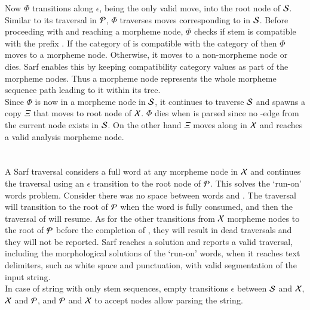 Now $\Phi$ transitions along $\epsilon$, being the only valid move, into the root node of ${\cal S}$. Similar to its traversal in ${\cal P}$, $\Phi$ traverses moves corresponding to   in ${\cal S}$. 
%
Before proceeding with  and reaching a morpheme node, $\Phi$ checks if stem  is compatible with the prefix . 
If the category of  is compatible with the category of
 then $\Phi$ moves to a morpheme node. 
Otherwise, it moves to a non-morpheme node or dies. 
Sarf enables this by keeping compatibility category values as part of the morpheme nodes.%
Thus a morpheme node represents the whole morpheme sequence path leading to it within its tree.  
\\
Since $\Phi$ is now in a morpheme node in ${\cal S}$, it continues 
to traverse ${\cal S}$ and spawns a copy $\Xi$ that moves to root node of ${\cal X}$. 
$\Phi$ dies when  is parsed since no
-edge from the current node exists in ${\cal S}$.
On the other hand $\Xi$ moves along  in ${\cal X}$ and reaches a valid analysis morpheme node.
\\\\\\
A Sarf traversal considers a full word at any morpheme node in ${\cal X}$ 
and continues the traversal using an $\epsilon$ transition
to the root node of ${\cal P}$.
This solves the `run-on' words problem.
Consider there was no space between words 
and 
.
The traversal will transition to the root of ${\cal P}$ when the word 
 is fully consumed, and then the traversal of 
 will resume. 
As for the other transitions from ${\cal X}$ morpheme nodes to the root of ${\cal P}$
before the completion of 
, they will result in dead traversals and 
they will not be reported. 
%
Sarf reaches a solution and reports a valid traversal, including the morphological solutions of 
the `run-on' words, when it reaches text delimiters, 
such as white space and punctuation, with valid segmentation of the input string. \\
In case of string with only stem sequences, empty transitions $\epsilon$ between ${\cal S}$ and ${\cal X}$, ${\cal X}$ and ${\cal P}$, 
and ${\cal P}$ and ${\cal X}$ to accept nodes allow parsing the string.

